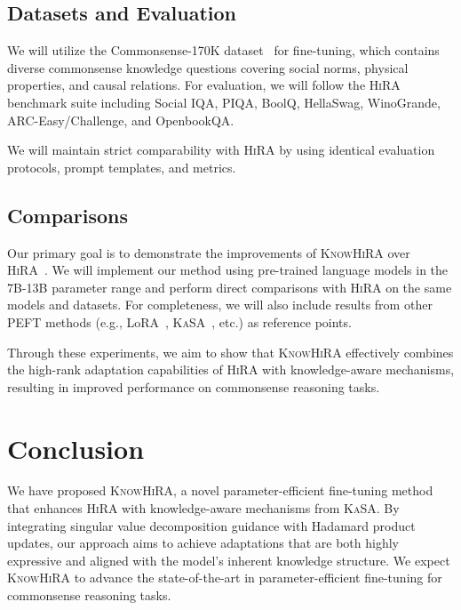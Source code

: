 \documentclass[10pt,letterpaper]{article}
\begin{document}
\subsection{Datasets and Evaluation}

We will utilize the Commonsense-170K dataset~\cite{llm-adapters} for fine-tuning, which contains diverse commonsense knowledge questions covering social norms, physical properties, and causal relations. For evaluation, we will follow the \textsc{HiRA} benchmark suite including Social IQA, PIQA, BoolQ, HellaSwag, WinoGrande, ARC-Easy/Challenge, and OpenbookQA. 

We will maintain strict comparability with \textsc{HiRA} by using identical evaluation protocols, prompt templates, and metrics.

\subsection{Comparisons}

Our primary goal is to demonstrate the improvements of \textsc{KnowHiRA} over \textsc{HiRA}~\cite{huang2025hira}. We will implement our method using pre-trained language models in the 7B-13B parameter range and perform direct comparisons with \textsc{HiRA} on the same models and datasets. For completeness, we will also include results from other PEFT methods (e.g., LoRA~\cite{hu2021lora}, \textsc{KaSA}~\cite{wang2024kasa}, etc.) as reference points.

Through these experiments, we aim to show that \textsc{KnowHiRA} effectively combines the high-rank adaptation capabilities of \textsc{HiRA} with knowledge-aware mechanisms, resulting in improved performance on commonsense reasoning tasks.

\section{Conclusion}

We have proposed \textsc{KnowHiRA}, a novel parameter-efficient fine-tuning method that enhances \textsc{HiRA} with knowledge-aware mechanisms from \textsc{KaSA}. By integrating singular value decomposition guidance with Hadamard product updates, our approach aims to achieve adaptations that are both highly expressive and aligned with the model's inherent knowledge structure. We expect \textsc{KnowHiRA} to advance the state-of-the-art in parameter-efficient fine-tuning for commonsense reasoning tasks.



\end{document}
